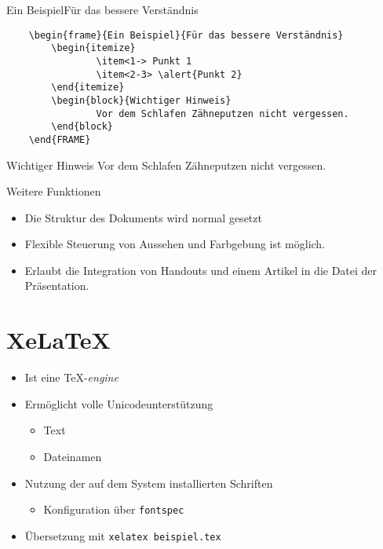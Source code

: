 \documentclass[11pt]{beamer}
\begin{document}
\begin{frame}[fragile]{Ein Beispiel}{Für das bessere Verständnis}
	\begin{small}
		
	\begin{verbatim}
	\begin{frame}{Ein Beispiel}{Für das bessere Verständnis}
	  	\begin{itemize}
    			\item<1-> Punkt 1
    			\item<2-3> \alert{Punkt 2}
  		\end{itemize}
  		\begin{block}{Wichtiger Hinweis}
    			Vor dem Schlafen Zähneputzen nicht vergessen.
  		\end{block}
	\end{FRAME}

	\end{verbatim}
	\end{small}
	
	\begin{block}{Wichtiger Hinweis}
		Vor dem Schlafen Zähneputzen nicht vergessen.
	\end{block}
\end{frame}

\begin{frame}{Weitere Funktionen}
	\transsplithorizontalin
	\begin{itemize}
		\item Die Struktur des Dokuments wird normal gesetzt
		\item Flexible Steuerung von Aussehen und Farbgebung ist möglich.
		\item Erlaubt die Integration von Handouts und einem Artikel in die Datei der Präsentation.
	\end{itemize}
\end{frame}

\section{XeLaTeX}

\begin{frame}{\XeTeX}
	\begin{itemize}
		\item Ist eine \TeX-\emph{engine}
		\item Ermöglicht volle Unicodeunterstützung %
			\begin{itemize}
				\item Text
				\item Dateinamen
			\end{itemize}
		\item Nutzung der auf dem System installierten Schriften
			\begin{itemize}
				\item Konfiguration über \texttt{fontspec}
			\end{itemize}
		\item Übersetzung mit \texttt{xelatex beispiel.tex}
	\end{itemize}
	
\end{frame}
\end{document}

